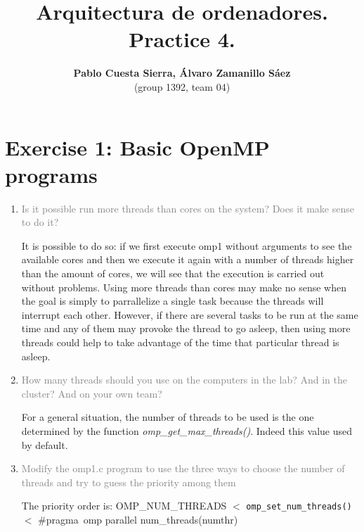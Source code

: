 \documentclass{article}
\begin{document}
\title{\textbf{Arquitectura de ordenadores. Practice 4.}}
\author{\textbf{Pablo Cuesta Sierra, Álvaro Zamanillo Sáez}\\(group 1392, team 04)}
\maketitle

\begin{tcolorbox}
\tableofcontents
\end{tcolorbox}


\newpage
\section{Exercise 1: Basic OpenMP programs}

\begin{enumerate}
\item \textcolor{gray}{Is it possible run more threads than cores on the system? Does it make sense to do it?}

It is possible to do so: if we first execute omp1 without arguments to see the available cores and then we execute it again with a number of threads higher than the amount of cores, we will see that the execution is carried out without problems. Using more threads than cores may make no sense when the goal is simply to parrallelize a single task because the threads will interrupt each other. However, if there are several tasks to be run at the same time and any of them may provoke the thread to go asleep, then using more threads could help to take advantage of the time that particular thread is asleep. 


\item \textcolor{gray}{How many threads should you use on the computers in the lab? And in the cluster? And on your own team?} 

For a general situation, the number of threads to be used is the one determined by the function \emph{omp\_get\_max\_threads()}. Indeed this value used by default.

\item \textcolor{gray}{Modify the omp1.c program to use the three ways to choose the number of threads and try to guess the priority among them}

The priority order is: \texttt{}{OMP\_NUM\_THREADS} $<$ \texttt{omp\_set\_num\_threads()} $<$ \#pragma\ omp parallel num\_threads(numthr) 


\end{enumerate}
\end{document}
